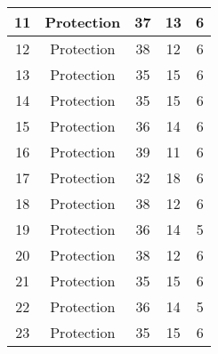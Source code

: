 \documentclass[results.tex]{subfiles}
\begin{document}
\begin{center}
\begin{tabular}{| c || c | c | c | c |}
            \hline
            11                      & Protection                   & 37                     & 13                      & 6                    \\
            \hline
            12                      & Protection                   & 38                     & 12                      & 6                    \\
            \hline
            13                      & Protection                   & 35                     & 15                      & 6                    \\
            \hline
            14                      & Protection                   & 35                     & 15                      & 6                    \\
            \hline
            15                      & Protection                   & 36                     & 14                      & 6                    \\
            \hline
            16                      & Protection                   & 39                     & 11                      & 6                    \\
            \hline
            17                      & Protection                   & 32                     & 18                      & 6                    \\
            \hline
            18                      & Protection                   & 38                     & 12                      & 6                    \\
            \hline
            19                      & Protection                   & 36                     & 14                      & 5                    \\
            \hline
            20                      & Protection                   & 38                     & 12                      & 6                    \\
            \hline
            21                      & Protection                   & 35                     & 15                      & 6                    \\
            \hline
            22                      & Protection                   & 36                     & 14                      & 5                    \\
            \hline
            23                      & Protection                   & 35                     & 15                      & 6                    \\

\end{tabular}
\end{center}
\end{document}
